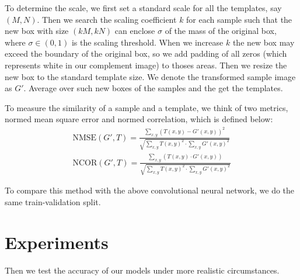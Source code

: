 \documentclass[journal]{IEEEtran}
\begin{document}
To determine the scale, we first set a standard scale for all the templates, say $(M,N)$. Then we search the scaling coefficient $k$ for each sample such that the new box with size $(kM,kN)$ can enclose $\sigma$ of the mass of the original box, where $\sigma\in (0,1)$ is the scaling threshold. When we increase $k$ the new box may exceed the boundary of the original box, so we add padding of all zeros (which represents white in our complement image) to thoses areas. Then we resize the new box to the standard template size. We denote the transformed sample image as $G'$. Average over such new boxes of the samples and the get the templates.

To measure the similarity of a sample and a template, we think of two metrics, normed mean square error and normed correlation, which is defined below:
\begin{align*}
	\text{NMSE}(G',T)= \frac{\sum_{x,y} (T(x,y)-G'(x,y))^2}{\sqrt{\sum_{x,y}T(x,y)^2 \cdot \sum_{x,y} G'(x,y)^2}} \\
	\text{NCOR}(G',T)= \frac{\sum_{x,y} (T(x,y) \cdot G'(x,y))}{\sqrt{\sum_{x,y}T(x,y)^2 \cdot \sum_{x,y} G'(x,y)^2}}
\end{align*}

To compare this method with the above convolutional neural network, we do the same train-validation split.

\section{Experiments}
Then we test the accuracy of our models under more realistic circumstances.
\end{document}
